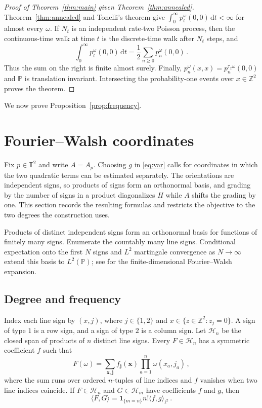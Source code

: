 \documentclass[11pt]{amsart}
\theoremstyle{plain}
\theoremstyle{definition}
\newcommand{\Z}{\mathbb Z}
\newcommand{\T}{\mathbb T}
\renewcommand{\P}{\mathbb P}
\newcommand{\1}{\mathbf 1}
\newcommand{\ip}[2]{\langle #1,#2\rangle}
\newcommand{\dd}{\,\mathrm d}
\newcommand{\Hs}{\mathcal H}
\begin{document}
\begin{proof}[Proof of Theorem~\ref{thm:main} given Theorem~\ref{thm:annealed}]
Theorem~\ref{thm:annealed} and Tonelli's theorem give
$\int_0^\infty p_t^\omega(0,0)\dd t<\infty$ for almost every $\omega$.  If
$N_t$ is an independent rate-two Poisson process, then the continuous-time
walk at time $t$ is the discrete-time walk after $N_t$ steps, and
\[
  \int_0^\infty p_t^\omega(0,0)\dd t
  =\frac12\sum_{n\geq0}p_n^\omega(0,0)\, .
\]
Thus the sum on the right is finite almost surely.  Finally,
$p_n^\omega(x,x)=p_n^{\tau_x\omega}(0,0)$ and $\P$ is translation invariant.
Intersecting the probability-one events over $x\in\Z^2$ proves the theorem.
\end{proof}

We now prove Proposition~\ref{prop:frequency}.

\section{Fourier--Walsh coordinates}\label{sec:coins}

Fix $p\in\T^2$ and write $A=A_p$.  Choosing $g$ in \eqref{eq:var} calls for
coordinates in which the two quadratic terms can be estimated separately.
The orientations are independent signs, so products of signs form an
orthonormal basis, and grading by the number of signs in a product
diagonalizes $H$ while $A$ shifts the grading by one.  This section records
the resulting formulas and restricts the objective to the two degrees the
construction uses.

Products of distinct independent signs form an orthonormal basis for
functions of finitely many signs.  Enumerate the countably many line signs.  Conditional expectation onto the first $N$
signs and $L^2$ martingale convergence as $N\to\infty$ extend this basis to
$L^2(\P)$; see \citet*[Theorem~1.5]{ODo14} for the finite-dimensional
Fourier--Walsh expansion.

\subsection{Degree and frequency}\label{ssec:degree}

Index each line sign by $(x,j)$, where $j\in\{1,2\}$ and
$x\in\{z\in\Z^2:z_j=0\}$.  A sign of type $1$ is a row sign,
and a sign of type $2$ is a column sign.  Let $\Hs_n$ be the closed span of
products of $n$ distinct line signs.  Every $F\in\Hs_n$ has a symmetric
coefficient $f$ such that
\[
  F(\omega)=\sum_{\mathbf x,\mathbf j}f_{\mathbf j}(\mathbf x)
  \prod_{a=1}^n\omega(x_a,j_a)\, ,
\]
where the sum runs over ordered $n$-tuples of line indices and $f$ vanishes when two line indices coincide.  If $F\in\Hs_n$ and
$G\in\Hs_m$ have coefficients $f$ and $g$, then
\begin{equation}\label{eq:iso}
  \ip FG=\1_{\{m=n\}}n!\ip fg_{\ell^2}\, .
\end{equation}
\end{document}
